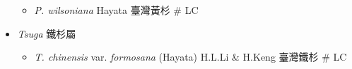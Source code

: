\begin{itemize}
  \begin{itemize}
        \item[] \textit{P. wilsoniana} Hayata  臺灣黃杉  \# LC
  \end{itemize}
 \item[] \textit{Tsuga} 鐵杉屬
                            
  \begin{itemize}
        \item[] \textit{T. chinensis} var. \textit{formosana} (Hayata) H.L.Li \& H.Keng 
                                    臺灣鐵杉  \# LC
  \end{itemize}
  \end{itemize}
